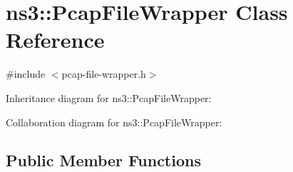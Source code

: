 \hypertarget{classns3_1_1PcapFileWrapper}{}\section{ns3\+:\+:Pcap\+File\+Wrapper Class Reference}
\label{classns3_1_1PcapFileWrapper}


{\ttfamily \#include $<$pcap-\/file-\/wrapper.\+h$>$}



Inheritance diagram for ns3\+:\+:Pcap\+File\+Wrapper\+:


Collaboration diagram for ns3\+:\+:Pcap\+File\+Wrapper\+:
\subsection*{Public Member Functions}
